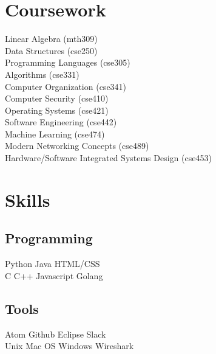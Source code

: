 \documentclass[]{deedy-resume-openfont}
\begin{document}
\begin{minipage}[t]{0.33\textwidth}
\section{Coursework}
Linear Algebra (mth309) \\
Data Structures (cse250) \\
Programming Languages (cse305) \\
Algorithms (cse331) \\
Computer Organization (cse341) \\
Computer Security (cse410) \\
Operating Systems (cse421) \\
Software Engineering (cse442) \\
Machine Learning (cse474) \\
Modern Networking Concepts (cse489) \\
Hardware/Software Integrated Systems Design (cse453) \\
\sectionsep


\section{Skills}
\subsection{Programming}
Python \textbullet{}   Java \textbullet{} HTML/CSS \\
C \textbullet{} C++ \textbullet{} Javascript \textbullet{} Golang \\
\sectionsep

\subsection{Tools}
Atom \textbullet{} Github \textbullet{} Eclipse \textbullet{} Slack \\
Unix \textbullet{} Mac OS \textbullet{} Windows \textbullet{} Wireshark \\
\sectionsep
%
%

\end{minipage} 
\hfill
\end{document}
